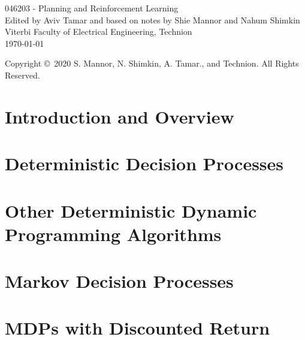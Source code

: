 \documentclass[11pt]{report}
\numberwithin{proposition}{chapter}
\numberwithin{corollary}{chapter}
\numberwithin{assumption}{chapter}
\numberwithin{lemma}{chapter}
\numberwithin{definition}{chapter}
\numberwithin{theorem}{chapter}
\numberwithin{example}{chapter}
\numberwithin{exercise}{chapter}
\numberwithin{remark}{chapter}
\numberwithin{algorithm_}{chapter}
\begin{document}
\begin{titlepage}
\begin{center}
\Huge{046203 - Planning and Reinforcement Learning}\\[1cm]
\Large{Edited by Aviv Tamar and based on notes by Shie Mannor and Nahum Shimkin}\\[5cm]
\large{Viterbi Faculty of Electrical Engineering, Technion\\{\today}}
\end{center}
\vfill
Copyright \copyright~2020 S. Mannor, N. Shimkin, A. Tamar., and Technion. All Rights Reserved.
\end{titlepage}

\tableofcontents

\chapter{Introduction and Overview}


\chapter{Deterministic Decision Processes}


\chapter{Other Deterministic Dynamic Programming Algorithms}



\chapter{Markov Decision Processes}



\chapter{MDPs with Discounted Return}



% 
% 

% 
% 
\end{document}
